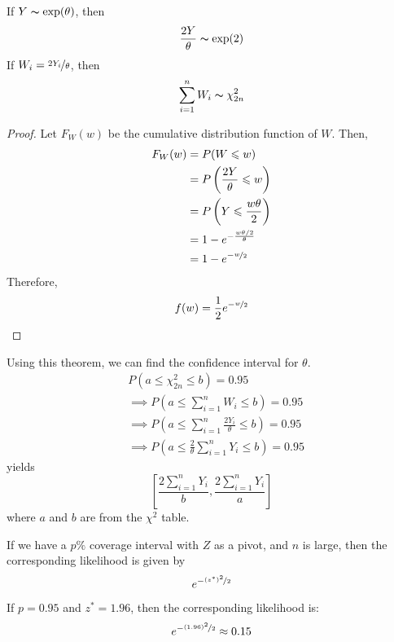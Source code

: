 \begin{thmbox}
    \begin{theorem}
        If $ Y \thicksim \exp(\theta) $, then
        \[ \frac{2Y}{\theta} \thicksim \exp(2) \]
        If $ W_i=\nicefrac{2Y_i}{\theta} $, then
        \[ \sum\limits_{i=1}^{n} W_i \thicksim \chi^2_{2n} \]
    \end{theorem}
\end{thmbox}
\begin{proof}
    Let $ F_W(w) $ be the cumulative distribution function of $ W $. Then,
    \begin{align*}
        F_W(w)
         & =P(W\leqslant w)                               \\
         & =P\left( \frac{2Y}{\theta} \leqslant w \right) \\
         & =P\left( Y\leqslant \frac{w\theta}{2} \right)  \\
         & =1-e^{-\frac{w\theta/2}{\theta}}               \\
         & =1-e^{-\nicefrac{w}{2}}
    \end{align*}
    Therefore,
    \[ f(w)=\frac{1}{2} e^{-\nicefrac{w}{2}} \]
\end{proof}
Using this theorem, we can find the confidence interval for $ \theta $.
\begin{align*}
     & P\left(a\leqslant \chi^2_{2n}\leqslant b\right)=0.95                                         \\
     & \implies P\left(a \leqslant \sum\limits_{i=1}^{n} W_i \leqslant b\right)=0.95                \\
     & \implies P\left(a\leqslant \sum\limits_{i=1}^{n} \frac{2Y_i}{\theta} \leqslant b\right)=0.95 \\
     & \implies P\left(a\leqslant \frac{2}{\theta} \sum\limits_{i=1}^{n} Y_i\leqslant b\right)=0.95
\end{align*}
yields
\[ \left[ \frac{2 \sum\limits_{i=1}^{n} Y_i}{b} , \frac{2 \sum\limits_{i=1}^{n} Y_i}{a} \right] \]
where $ a $ and $ b $ are from the $ \chi^2 $ table.

\begin{thmbox}
    \begin{theorem}
        If we have a $ p\% $ coverage interval with $ Z $ as a pivot, and $ n $ is large, then
        the corresponding likelihood is given by
        \[ e^{-\nicefrac{(z^*)^2}{2} } \]
    \end{theorem}
\end{thmbox}

\begin{exbox}
    \begin{example}
        If $ p=0.95 $ and $ z^*=1.96 $, then the corresponding likelihood is:
        \[ e^{-\nicefrac{(1.96)^2}{2} }\approx 0.15 \]
    \end{example}
\end{exbox}
